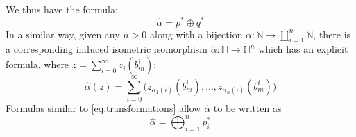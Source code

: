 \documentclass[12pt]{article}
\theoremstyle{plain}
\theoremstyle{definition}
\newcommand{\bb}[1]{\mathbb{#1}}
\newcommand{\lto}{\longrightarrow}
\begin{document}
We thus have the formula:
\begin{equation}
    \hat{\alpha} = p^\ast \oplus q^\ast
\end{equation}
In a similar way, given any $n > 0$ along with a bijection $\alpha: \bb{N} \lto \coprod_{i = 1}^n\bb{N}$, there is a corresponding induced isometric isomorphism $\hat{\alpha}: \bb{H} \lto \bb{H}^n$ which has an explicit formula, where $z = \sum_{i = 0}^\infty z_i(b_m^i)$:
\begin{equation}
    \hat{\alpha}(z) = \sum_{i = 0}^\infty \Big(z_{\alpha_1(i)}(b^i_m),...,z_{\alpha_n(i)}(b^i_m)\Big)
\end{equation}
Formulas similar to \eqref{eq:transformations} allow $\hat{\alpha}$ to be written as
\begin{equation}
    \hat{\alpha} = \bigoplus_{i = 1}^n p_i^\ast
\end{equation}
\end{document}
